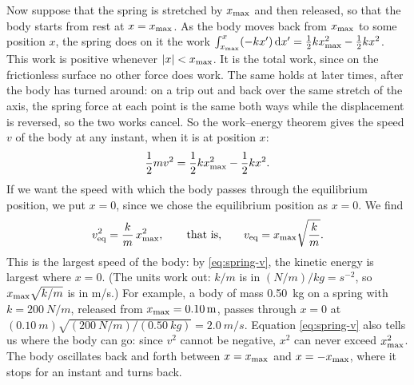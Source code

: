 \documentclass[11pt,a4paper]{article}
\begin{document}
Now suppose that the spring is stretched by $x_{\mathrm{max}}$ and then released, so that the body starts
from rest at $x = x_{\mathrm{max}}$. As the body moves back from $x_{\mathrm{max}}$ to some position $x$, the
spring does on it the work $\int_{x_{\mathrm{max}}}^{x}(-kx')\,\mathrm{d} x' = \frac12 kx_{\mathrm{max}}^2 - \frac12
kx^2$. This work is positive whenever $|x| < x_{\mathrm{max}}$. It is the total work, since on the
frictionless surface no other force does work. The same holds at later times, after the body has
turned around: on a trip out and back over the same stretch of the axis, the spring force at each
point is the same both ways while the displacement is reversed, so the two works cancel. So the
work--energy theorem gives the speed $v$ of the body at any instant, when it is at position $x$:
\begin{equation}\label{eq:spring-v}
  \frac12 mv^2 = \frac12 kx_{\mathrm{max}}^2 - \frac12 kx^2 .
\end{equation}
If we want the speed with which the body passes through the equilibrium position, we put $x = 0$,
since we chose the equilibrium position as $x = 0$. We find
\begin{equation}\label{eq:v-eq}
  v_{\mathrm{eq}}^2 = \frac{k}{m}\,x_{\mathrm{max}}^2 , \qquad\text{that is,}\qquad
  v_{\mathrm{eq}} = x_{\mathrm{max}}\sqrt{\frac{k}{m}} .
\end{equation}
This is the largest speed of the body: by \eqref{eq:spring-v}, the kinetic energy is largest where
$x = 0$. (The units work out: $k/m$ is in $(\unit{N/m})/\unit{kg} = \unit{s^{-2}}$, so
$x_{\mathrm{max}}\sqrt{k/m}$ is in \unit{m/s}.) For example, a body of mass \qty{0.50}{kg} on a spring with
$k = \qty{200}{N/m}$, released from $x_{\mathrm{max}} = \qty{0.10}{m}$, passes through $x = 0$ at
$(\qty{0.10}{m})\sqrt{(\qty{200}{N/m})/(\qty{0.50}{kg})} = \qty{2.0}{m/s}$. Equation
\eqref{eq:spring-v} also tells us where the body can go: since $v^2$ cannot be negative, $x^2$ can
never exceed $x_{\mathrm{max}}^2$. The body oscillates back and forth between $x = x_{\mathrm{max}}$ and
$x = -x_{\mathrm{max}}$, where it stops for an instant and turns back.
\end{document}
